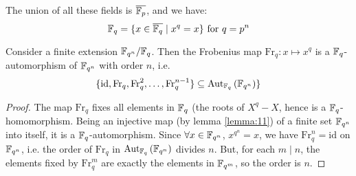 \begin{figure}[H]
  \centering
\end{figure}
The union of all these fields is $\overline{\finitefield{p}}$, and we have:
\begin{equation*}
  \finitefield{q} = \{ x \in \overline{\finitefield{q}} \mid x^q = x \} \text{ for } q = p^n
\end{equation*}

\begin{lemma}
  \label{lemma:66}
  Consider a finite extension $\finitefield{q^n}/\finitefield{q}$. Then the Frobenius map $\text{Fr}_q : x \mapsto x^q$ is a $\finitefield{q}$-automorphism of $\finitefield{q^n}$ with order $n$, i.e. 
  \begin{equation*}
    \{ \text{id}, \text{Fr}_q, \text{Fr}_q^2, \ldots, \text{Fr}_q^{n-1} \} \subseteq \autset[\finitefield{q}]{\finitefield{q^n}} \}
  \end{equation*}
\end{lemma}

\begin{proof}
  The map $\text{Fr}_q$ fixes all elements in $\finitefield{q}$ (the roots of $X^q-X$, hence is a $\finitefield{q}$-homomorphism. Being an injective map (by lemma \ref{lemma:11}) of a finite set $\finitefield{q^n}$ into itself, it is a $\finitefield{q}$-automorphism. Since $\forall x \in \finitefield{q^n}$, $x^{q^n}=x$, we have $\text{Fr}_q^n = \text{id}$ on $\finitefield{q^n}$, i.e. the order of $\text{Fr}_q$ in $\autset[\finitefield{q}]{\finitefield{q^n}}$ divides $n$. But, for each $m \mid n$, the elements fixed by $\text{Fr}_q^m$ are exactly the elements in $\finitefield{q^m}$, so the order is $n$.
\end{proof}


